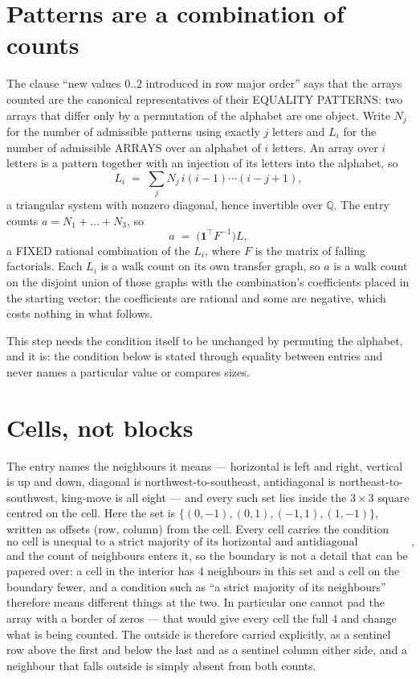 \documentclass[11pt,a4paper]{article}
\theoremstyle{plain}
\theoremstyle{definition}
\begin{document}
\section{Patterns are a combination of counts}

The clause ``new values $0..2$ introduced in row major order'' says that the arrays
counted are the canonical representatives of their EQUALITY PATTERNS: two arrays that differ
only by a permutation of the alphabet are one object. Write $N_j$ for the number of admissible
patterns using exactly $j$ letters and $L_i$ for the number of admissible ARRAYS over an
alphabet of $i$ letters. An array over $i$ letters is a pattern together with an injection of
its letters into the alphabet, so
\[
L_i\;=\;\sum_{j}N_j\,i(i-1)\cdots(i-j+1),
\]
a triangular system with nonzero diagonal, hence invertible over $\mathbb{Q}$. The entry
counts $a=N_1+\dots+N_{3}$, so
\[
a\;=\;\bigl(\mathbf{1}^{\!\top}F^{-1}\bigr)L ,
\]
a FIXED rational combination of the $L_i$, where $F$ is the matrix of falling factorials.
Each $L_i$ is a walk count on its own transfer graph, so $a$ is a walk count on the disjoint
union of those graphs with the combination's coefficients placed in the starting vector; the
coefficients are rational and some are negative, which costs nothing in what follows.

This step needs the condition itself to be unchanged by permuting the alphabet, and it is:
the condition below is stated through equality between entries and never names a particular
value or compares sizes.

\section{Cells, not blocks}

The entry names the neighbours it means --- horizontal is left and right, vertical is up and
down, diagonal is northwest-to-southeast, antidiagonal is northeast-to-southwest, king-move is
all eight --- and every such set lies inside the $3\times3$ square centred on the cell. Here
the set is $\{(0,-1), (0,1), (-1,1), (1,-1)\}$, written as offsets (row, column) from the cell. Every cell carries
the condition
\[
\text{no cell is unequal to a strict majority of its horizontal and antidiagonal neighbours},
\]
and the count of neighbours enters it, so the boundary is not a detail that can be papered
over: a cell in the interior has $4$ neighbours in this set and a cell on the boundary
fewer, and a condition such as ``a strict majority of its neighbours'' therefore means
different things at the two. In particular one cannot pad the array with a border of zeros ---
that would give every cell the full $4$ and change what is being counted. The outside is
therefore carried
explicitly, as a sentinel row above the first and below the last and as a sentinel column
either side, and a neighbour that falls outside is simply absent from both counts.
\end{document}
